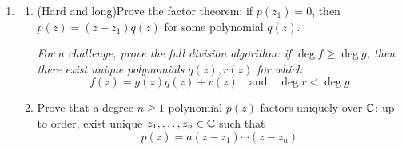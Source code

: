 \begin{exercises*}
\begin{enumerate}
  \item\begin{enumerate}
    \item (Hard and long)\quad Prove the factor theorem: if $p(z_1)=0$, then $p(z)=(z-z_1)q(z)$ for some polynomial $q(z)$.\par
    \emph{For a challenge, prove the full division algorithm: if $\deg f\ge \deg g$, then there exist unique polynomials $q(z),r(z)$ for which
    \[f(z)=g(z)q(z)+r(z)\quad\text{and}\quad \deg r<\deg g\]}
    \item Prove that a degree $n\ge 1$ polynomial $p(z)$ factors uniquely over $\mathbb{C}$: up to order, exist unique $z_1,\ldots,z_n\in\mathbb{C}$ such that
    \[p(z)=a(z-z_1)\cdots(z-z_n)\]
  \end{enumerate}
\end{enumerate}
\end{exercises*}

\fi